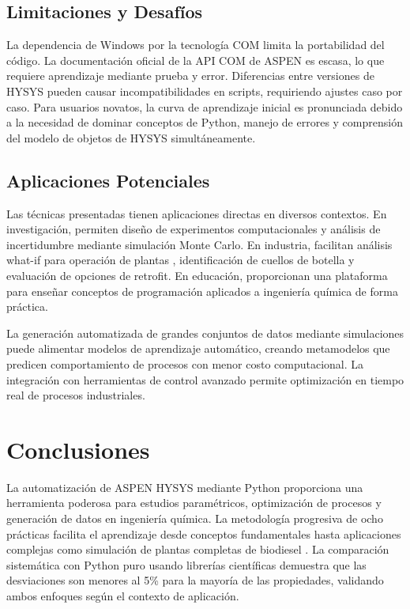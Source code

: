 \documentclass{syx7}
\begin{document}
\subsection{Limitaciones y Desafíos}

La dependencia de Windows por la tecnología COM limita la portabilidad del código. La documentación oficial de la API COM de ASPEN es escasa, lo que requiere aprendizaje mediante prueba y error. Diferencias entre versiones de HYSYS pueden causar incompatibilidades en scripts, requiriendo ajustes caso por caso. Para usuarios novatos, la curva de aprendizaje inicial es pronunciada debido a la necesidad de dominar conceptos de Python, manejo de errores y comprensión del modelo de objetos de HYSYS simultáneamente.

\subsection{Aplicaciones Potenciales}

Las técnicas presentadas tienen aplicaciones directas en diversos contextos. En investigación, permiten diseño de experimentos computacionales y análisis de incertidumbre mediante simulación Monte Carlo. En industria, facilitan análisis what-if para operación de plantas \cite{turton2018analysis}, identificación de cuellos de botella y evaluación de opciones de retrofit. En educación, proporcionan una plataforma para enseñar conceptos de programación aplicados a ingeniería química de forma práctica.

La generación automatizada de grandes conjuntos de datos mediante simulaciones puede alimentar modelos de aprendizaje automático, creando metamodelos que predicen comportamiento de procesos con menor costo computacional. La integración con herramientas de control avanzado permite optimización en tiempo real de procesos industriales.

\section{Conclusiones}

La automatización de ASPEN HYSYS \cite{aspentech2020hysys} mediante Python \cite{python2023} proporciona una herramienta poderosa para estudios paramétricos, optimización de procesos y generación de datos en ingeniería química. La metodología progresiva de ocho prácticas facilita el aprendizaje desde conceptos fundamentales hasta aplicaciones complejas como simulación de plantas completas de biodiesel \cite{demirbas2009biodiesel,tapanes2008transesterification}. La comparación sistemática con Python puro usando librerías científicas \cite{thermo2023,chemicals2023,bell2016coolprop,virtanen2020scipy} demuestra que las desviaciones son menores al 5\% para la mayoría de las propiedades, validando ambos enfoques según el contexto de aplicación.
\end{document}
